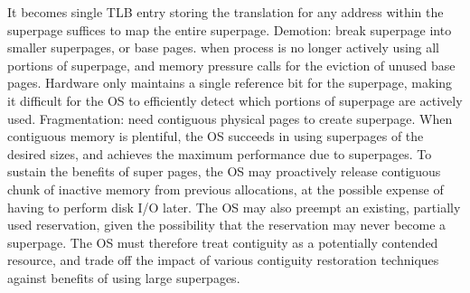 \documentclass[10pt,landscape]{article}
\begin{document}
\begin{multicols}{3}
It becomes single TLB entry storing the translation for any address within the superpage suffices to map the entire superpage. Demotion: break superpage into smaller superpages, or base pages. when process is no longer actively using all portions of superpage, and memory pressure calls for the eviction of unused base pages. Hardware only maintains a single reference bit for the superpage, making it difficult for the OS to efficiently detect which portions of superpage are actively used. Fragmentation: need contiguous physical pages to create superpage. When contiguous memory is plentiful, the OS succeeds in using superpages of the desired sizes, and achieves the maximum performance due to superpages. To sustain the benefits of super pages, the OS may proactively release contiguous chunk of inactive memory from previous allocations, at the possible expense of having to perform disk I/O later. The OS may also preempt an existing, partially used reservation, given the possibility that the reservation may never become a superpage. The OS must therefore treat contiguity as a potentially contended resource, and trade off the impact of various contiguity restoration techniques against benefits of using large superpages.

\scriptsize


\end{multicols}
\end{document}
